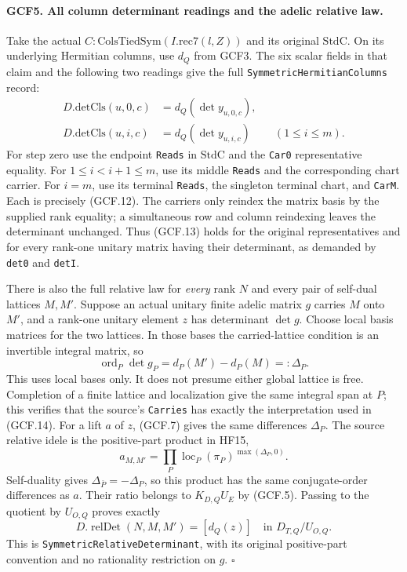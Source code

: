 \paragraph{GCF5. All column determinant readings and the adelic relative law.}
\label{claim:GCF5}
Take the actual \(C:\mathrm{ColsTiedSym}(I.\mathrm{rec7}(l,Z))\)
and its original \(\mathrm{StdC}\).  On its underlying Hermitian
columns, use \(d_Q\) from GCF3.  The six scalar fields in that claim
and the following two readings give the full
\texttt{SymmetricHermitianColumns} record:
\[
 \begin{aligned}
 D.\mathrm{detCls}(u,0,c)&=d_Q(\det y_{u,0,c}),\\
 D.\mathrm{detCls}(u,i,c)&=d_Q(\det y_{u,i,c})
                                  &&(1\le i\le m).
 \end{aligned}                                                   \tag{GCF.13}
\]
For step zero use the endpoint \texttt{Reads} in \(\mathrm{StdC}\)
and the \texttt{Car0} representative equality.  For
\(1\le i<i+1\le m\), use its middle \texttt{Reads} and the
corresponding chart carrier.  For \(i=m\), use its terminal
\texttt{Reads}, the singleton terminal chart, and \texttt{CarM}.
Each is precisely (GCF.12).  The carriers only reindex the matrix
basis by the supplied rank equality; a simultaneous row and column
reindexing leaves the determinant unchanged.  Thus (GCF.13) holds for
the original representatives and for every rank-one unitary matrix
having their determinant, as demanded by \texttt{det0} and
\texttt{detI}.

There is also the full relative law for \emph{every} rank \(N\) and
every pair of self-dual lattices \(M,M'\).  Suppose an actual unitary
finite adelic matrix \(g\) carries \(M\) onto \(M'\), and a
rank-one unitary element \(z\) has determinant \(\det g\).  Choose
local basis matrices for the two lattices.  In those bases the
carried-lattice condition is an invertible integral matrix, so
\[
 \operatorname{ord}_P\det g_P=d_P(M')-d_P(M)=:\Delta_P.
 \tag{GCF.14}
\]
This uses local bases only.  It does not presume either global lattice
is free.  Completion of a finite lattice and localization give the
same integral span at \(P\); this verifies that the source's
\texttt{Carries} has exactly the interpretation used in (GCF.14).
For a lift \(a\) of \(z\), (GCF.7) gives the same differences
\(\Delta_P\).  The source relative idele is the positive-part
product in HF15,
\[
              a_{M,M'}=\prod_P
                  \operatorname{loc}_P(\pi_P)^{\max(\Delta_P,0)}.
\]
Self-duality gives \(\Delta_{\bar P}=-\Delta_P\), so this product
has the same conjugate-order differences as \(a\).
Their ratio belongs to \(K_{D,Q}U_E\) by (GCF.5).  Passing to the
quotient by \(U_{O,Q}\) proves exactly
\[
       D.\operatorname{relDet}(N,M,M')=[d_Q(z)]
                                  \quad\text{in }D_{T,Q}/U_{O,Q}.
 \tag{GCF.15}
\]
This is \texttt{SymmetricRelativeDeterminant}, with its original
positive-part convention and no rationality restriction on \(g\).
\hfill\(\square\)

